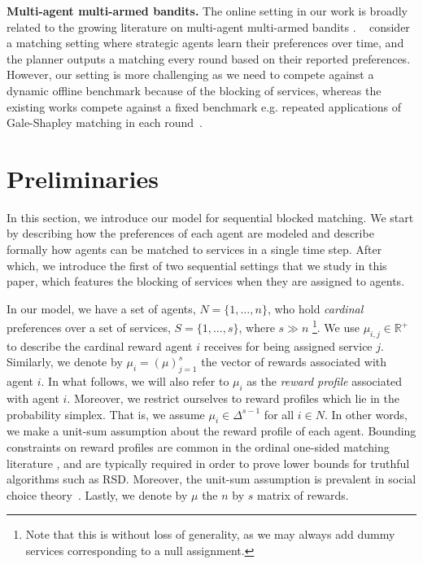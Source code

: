 \documentclass[letterpaper,11pt]{article}
\newcommand{\citet}[1]{\citeauthor*{#1}~\cite{#1}}
\begin{document}



\textbf{Multi-agent multi-armed bandits.} The online setting in our work is broadly related to the growing literature on multi-agent multi-armed bandits \cite{LMJ20,SBS21,BBLB20}. \citet{LMJ20} consider a matching setting where strategic agents learn their preferences over time, and the planner outputs a matching every round based on their reported preferences. However, our setting is more challenging as we need to compete against a dynamic offline benchmark because of the blocking of services, whereas the existing works compete against a fixed benchmark e.g. repeated applications of Gale-Shapley matching in each round~\cite{LMJ20}.

\section{Preliminaries}
\label{sec:2}
 In this section, we introduce our model for sequential blocked matching. We start by describing how the preferences of each agent are modeled and describe formally how agents can be matched to services in a single time step. After which, we introduce the first of two sequential settings that we study in this paper, which features the blocking of services when they are assigned to agents.

    In our model, we have a set of agents, $N = \{1, \dots, n\}$, who hold \emph{cardinal} preferences over a set of services, $S = \{1, \dots, s \}$, where $s \gg n$ \footnote{Note that this is without loss of generality, as we may always add dummy services corresponding to a null assignment.}. We use $\mu_{i, j} \in \mathbb{R}^{+}$ to describe the cardinal reward agent $i$ receives for being assigned service $j$. Similarly, we denote by $\mu_{i} = (\mu)^{s}_{j=1}$ the vector of rewards associated with agent $i$. In what follows, we will also refer to $\mu_{i}$ as the \emph{reward profile} associated with agent $i$. Moreover, we restrict ourselves to reward profiles which lie in the probability simplex. That is, we assume $\mu_{i} \in \Delta^{s-1}$ for all $i \in N$. In other words, we make a  unit-sum assumption about the reward profile of each agent. Bounding constraints on reward profiles are common in the ordinal one-sided matching literature \cite{FFKZ14}, and are typically required in order to prove lower bounds for truthful algorithms such as RSD. Moreover, the unit-sum assumption is prevalent in social choice theory~\cite{BCHL+15}. Lastly, we denote by $\mu$ the $n$ by $s$ matrix of rewards.
    
\end{document}
